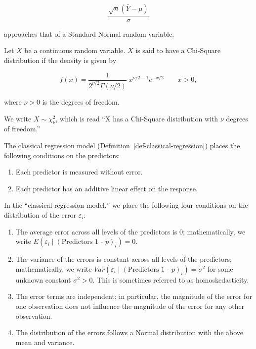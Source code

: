 \documentclass[
  letterpaper,
  DIV=11,
  numbers=noendperiod]{scrreprt}
\providecommand{\tightlist}{%
  \setlength{\itemsep}{0pt}\setlength{\parskip}{0pt}}\usepackage{longtable,booktabs,array}
\theoremstyle{definition}
\theoremstyle{definition}
\theoremstyle{remark}
\begin{document}
\[\frac{\sqrt{n}\left(\bar{Y} - \mu\right)}{\sigma}\]

approaches that of a Standard Normal random variable.

\begin{description}
\tightlist
\item[Chi-Square Distribution
(Definition~\ref{def-chi-square-distribution})]
Let \(X\) be a continuous random variable. \(X\) is said to have a
Chi-Square distribution if the density is given by
\end{description}

\[f(x) = \frac{1}{2^{\nu/2}\Gamma (\nu/2)}\;x^{\nu/2-1}e^{-x/2} \qquad x > 0,\]

where \(\nu > 0\) is the degrees of freedom.

We write \(X \sim \chi^2_{\nu}\), which is read ``X has a Chi-Square
distribution with \(\nu\) degrees of freedom.''

\begin{description}
\tightlist
\item[Classical Regression (Conditions on Predictors)
(Definition~\ref{def-classical-regression-cont})]
The classical regression model
(Definition~\ref{def-classical-regression}) places the following
conditions on the predictors:
\end{description}

\begin{enumerate}
\def\labelenumi{\arabic{enumi}.}
\tightlist
\item
  Each predictor is measured without error.
\item
  Each predictor has an additive linear effect on the response.
\end{enumerate}

\begin{description}
\tightlist
\item[Classical Regression Model
(Definition~\ref{def-classical-regression})]
In the ``classical regression model,'' we place the following four
conditions on the distribution of the error \(\varepsilon_i\):
\end{description}

\begin{enumerate}
\def\labelenumi{\arabic{enumi}.}
\tightlist
\item
  The average error across all levels of the predictors is 0;
  mathematically, we write
  \(E\left(\varepsilon_i \mid (\text{Predictors 1 - }p)_i\right) = 0\).
\item
  The variance of the errors is constant across all levels of the
  predictors; mathematically, we write
  \(Var\left(\varepsilon_i \mid (\text{Predictors 1 - }p)_i\right) = \sigma^2\)
  for some unknown constant \(\sigma^2 > 0\). This is sometimes referred
  to as homoskedasticity.
\item
  The error terms are independent; in particular, the magnitude of the
  error for one observation does not influence the magnitude of the
  error for any other observation.
\item
  The distribution of the errors follows a Normal distribution with the
  above mean and variance.
\end{enumerate}
\end{document}

